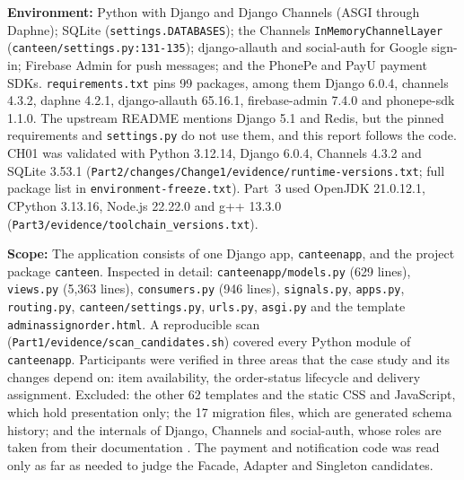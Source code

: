 \documentclass[11pt,a4paper]{article}
\newcommand{\entry}[1]{\par\textbf{#1:} }
\newcommand{\code}[1]{\nolinkurl{#1}}
\begin{document}
\entry{Environment}Python with Django and Django Channels (ASGI through Daphne); SQLite (\code{settings.DATABASES}); the Channels \code{InMemoryChannelLayer} (\code{canteen/settings.py:131-135}); django-allauth and social-auth for Google sign-in; Firebase Admin for push messages; and the PhonePe and PayU payment SDKs. \code{requirements.txt} pins 99 packages, among them Django 6.0.4, channels 4.3.2, daphne 4.2.1, django-allauth 65.16.1, firebase-admin 7.4.0 and phonepe-sdk 1.1.0. The upstream README mentions Django 5.1 and Redis, but the pinned requirements and \code{settings.py} do not use them, and this report follows the code. CH01 was validated with Python 3.12.14, Django 6.0.4, Channels 4.3.2 and SQLite 3.53.1 (\code{Part2/changes/Change1/evidence/runtime-versions.txt}; full package list in \code{environment-freeze.txt}). Part~3 used OpenJDK 21.0.12.1, CPython 3.13.16, Node.js 22.22.0 and g++ 13.3.0 (\code{Part3/evidence/toolchain_versions.txt}).

\entry{Scope}The application consists of one Django app, \code{canteenapp}, and the project package \code{canteen}. Inspected in detail: \code{canteenapp/models.py} (629 lines), \code{views.py} (5{,}363 lines), \code{consumers.py} (946 lines), \code{signals.py}, \code{apps.py}, \code{routing.py}, \code{canteen/settings.py}, \code{urls.py}, \code{asgi.py} and the template \code{adminassignorder.html}. A reproducible scan (\code{Part1/evidence/scan_candidates.sh}) covered every Python module of \code{canteenapp}. Participants were verified in three areas that the case study and its changes depend on: item availability, the order-status lifecycle and delivery assignment. Excluded: the other 62 templates and the static CSS and JavaScript, which hold presentation only; the 17 migration files, which are generated schema history; and the internals of Django, Channels and social-auth, whose roles are taken from their documentation \cite{djsignals,channels}. The payment and notification code was read only as far as needed to judge the Facade, Adapter and Singleton candidates.
\end{document}
